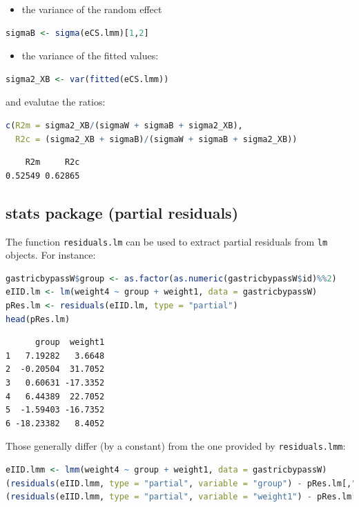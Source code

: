 \documentclass[12pt]{article}
\begin{document}
\begin{itemize}
\item the variance of the random effect
\end{itemize}
\begin{lstlisting}[language=r,numbers=none]
sigmaB <- sigma(eCS.lmm)[1,2]
\end{lstlisting}

\begin{itemize}
\item the variance of the fitted values:
\end{itemize}
\begin{lstlisting}[language=r,numbers=none]
sigma2_XB <- var(fitted(eCS.lmm))
\end{lstlisting}

and evalutae the ratios:
\begin{lstlisting}[language=r,numbers=none]
c(R2m = sigma2_XB/(sigmaW + sigmaB + sigma2_XB),
  R2c = (sigma2_XB + sigmaB)/(sigmaW + sigmaB + sigma2_XB))
\end{lstlisting}

\label{}
\begin{verbatim}
    R2m     R2c 
0.52549 0.62865
\end{verbatim}
\subsection{stats package (partial residuals)}
\label{sec:orgd6a87b4}

The function \texttt{residuals.lm} can be used to extract partial residuals
from \texttt{lm} objects. For instance:
\begin{lstlisting}[language=r,numbers=none]
gastricbypassW$group <- as.factor(as.numeric(gastricbypassW$id)%%2)
eIID.lm <- lm(weight4 ~ group + weight1, data = gastricbypassW)
pRes.lm <- residuals(eIID.lm, type = "partial")
head(pRes.lm)
\end{lstlisting}

\label{}
\begin{verbatim}
      group  weight1
1   7.19282   3.6648
2  -0.20504  31.7052
3   0.60631 -17.3352
4   6.44389  22.7052
5  -1.59403 -16.7352
6 -18.23382   8.4052
\end{verbatim}


Those generally differ (by a constant) from the one provided by
\texttt{residuals.lmm}:
\begin{lstlisting}[language=r,numbers=none]
eIID.lmm <- lmm(weight4 ~ group + weight1, data = gastricbypassW)
(residuals(eIID.lmm, type = "partial", variable = "group") - pRes.lm[,"group"])
(residuals(eIID.lmm, type = "partial", variable = "weight1") - pRes.lm[,"weight1"])
\end{lstlisting}
\end{document}
